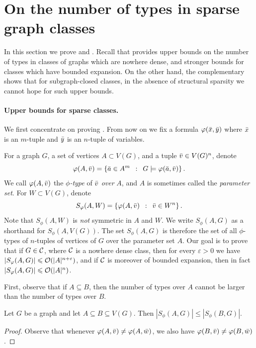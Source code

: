 \section{On the number of types in sparse graph classes}\label{sec:types}

In this section we prove  and .
	Recall that  provides upper bounds on the number of types in classes of graphs which are nowhere dense, 
	and stronger bounds for classes which have bounded expansion. 
	On the other hand, the complementary  shows that for subgraph-closed classes, in the absence of structural sparsity we cannot hope for such upper bounds.

\paragraph*{Upper bounds for sparse classes.}
We first concentrate on proving .
From now on we fix a formula  $\varphi(\bar{x},\bar{y})$ where
$\bar{x}$ is an $m$-tuple and $\bar{y}$ is an $n$-tuple of variables.

For a graph $G$, a set of  vertices $A\subset V(G)$, and a tuple $\bar{v}\in V(G)^n$,
denote
\[\varphi(A,\bar{v})=\left\{\bar{a} \in A^m  \,~:~\,  G\models\varphi(\bar{a},\bar{v}) \right\}.\]
We call $\varphi(A,\bar{v})$ the \emph{$\phi$-type} of $\bar{v}$ \emph{over} $A$, and
$A$ is sometimes called the \emph{parameter set}.
For $W\subset V(G)$, denote
\[S_\varphi(A,W)=\left\{\varphi(A,\bar{v}) \,~:~\,  \bar{v}\in W^n \right\}.\]
Note that $S_\phi(A,W)$ is \emph{not} symmetric in $A$ and $W$.
We write $S_\phi(A,G)$ as a shorthand for $S_\phi(A,V(G))$. 
The set $S_\phi(A,G)$ is therefore the set of all $\phi$-types of $n$-tuples 
of vertices of $G$ over the parameter set $A$.
Our goal is to prove that if $G\in \mathcal{C}$, where $\mathcal{C}$ is a nowhere dense class,
then for every $\varepsilon>0$ we have  $|S_\varphi(A,G)|\leqslant \mathcal{O}(|A|^{n+\varepsilon})$, and 
if $\mathcal{C}$ is moreover of bounded expansion, then in fact $|S_\varphi(A,G)|\leqslant \mathcal{O}(|A|^n)$.

First, observe that if $A\subseteq B$, then the number of types
over $A$ cannot be larger than the number of types over $B$. 

\begin{lemma}\label{lem:types-over-B}
Let $G$ be a graph and let $A\subseteq B\subseteq V(G)$. Then 
$|S_\phi(A,G)|\leq |S_\phi(B,G)|$. 
\end{lemma}
\begin{proof}
Observe that whenever $\varphi(A,\bar{v})\neq \varphi(A,\bar{w})$, we also have $\varphi(B,\bar{v})\neq \varphi(B,\bar{w})$.
\end{proof}

